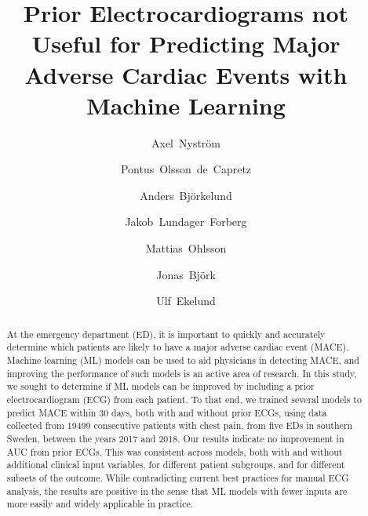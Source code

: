 \documentclass[preprint]{elsarticle}
\begin{document}
\begin{frontmatter}

\title{Prior Electrocardiograms not Useful for Predicting Major Adverse Cardiac Events with Machine Learning}


\author[inst1]{Axel~Nystr\"{o}m}
\author[inst2,inst3]{Pontus~Olsson~de~Capretz}
\author[inst4]{Anders~Bj\"{o}rkelund}
\author[inst3,inst5]{Jakob~Lundager~Forberg}
\author[inst4,inst6]{Mattias~Ohlsson}
\author[inst1,inst7]{Jonas~Bj\"{o}rk}
\author[inst2,inst3]{Ulf~Ekelund}


            







\begin{abstract}
At the emergency department (ED), it is important to quickly and accurately determine which patients are likely to have a major adverse cardiac event (MACE). Machine learning (ML) models can be used to aid physicians in detecting MACE, and improving the performance of such models is an active area of research. In this study, we sought to determine if ML models can be improved by including a prior electrocardiogram (ECG) from each patient. To that end, we trained several models to predict MACE within 30 days, both with and without prior ECGs, using data collected from 19499 consecutive patients with chest pain, from five EDs in southern Sweden, between the years 2017 and 2018. Our results indicate no improvement in AUC from prior ECGs. This was consistent across models, both with and without additional clinical input variables, for different patient subgroups, and for different subsets of the outcome. While contradicting current best practices for manual ECG analysis, the results are positive in the sense that ML models with fewer inputs are more easily and widely applicable in practice.
\end{abstract}


\end{frontmatter}
\end{document}
